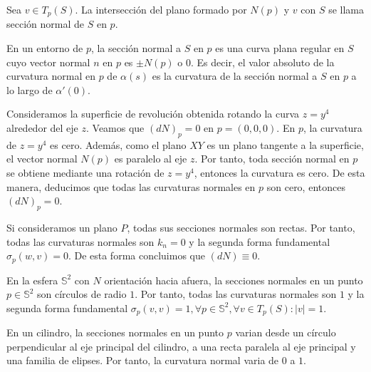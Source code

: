 \begin{defn}
  Sea $v \in T_{p}(S)$. La intersección del plano formado por $N(p)$ y $v$ con $S$ se llama sección normal de $S$ en $p$.
\end{defn}

\begin{obs}
  En un entorno de $p$, la sección normal a $S$ en $p$ es una curva plana regular en $S$ cuyo vector normal $n$ en $p$ es $\pm N(p)$ o $0$. Es decir, el valor absoluto de la curvatura normal en $p$ de $\alpha(s)$ es la curvatura de la sección normal a $S$ en $p$ a lo largo de $\alpha'(0)$.
\end{obs}

\begin{ejm}
  Consideramos la superficie de revolución obtenida rotando la curva $z = y^{4}$ alrededor del eje $z$. Veamos que $(d N)_{p} = 0$ en $p = (0, 0, 0)$. En $p$, la curvatura de $z = y^{4}$ es cero. Además, como el plano $XY$ es un plano tangente a la superficie, el vector normal $N(p)$ es paralelo al eje $z$. Por tanto, toda sección normal en $p$ se obtiene mediante una rotación de $z = y^{4}$, entonces la curvatura es cero. De esta manera, deducimos que todas las curvaturas normales en $p$ son cero, entonces $(d N)_{p} = 0$.
\end{ejm}

\begin{ejm}[Plano]
  Si consideramos un plano $P$, todas sus secciones normales son rectas. Por tanto, todas las curvaturas normales son $k_{n} = 0$ y la segunda forma fundamental $\sigma_{p}(w,v) = 0$. De esta forma concluimos que $(d N) \equiv 0$.
\end{ejm}

\begin{ejm}[Esfera]
  En la esfera $\mathbb{S}^{2}$ con $N$ orientación hacia afuera, la secciones normales en un punto $p \in \mathbb{S}^{2}$ son círculos de radio $1$. Por tanto, todas las curvaturas normales son $1$ y la segunda forma fundamental $\sigma_{p}(v,v) = 1, \forall p \in \mathbb{S}^{2}, \forall v \in T_{p}(S) : | v | = 1$.
\end{ejm}

\begin{ejm}[Cilindro]
  En un cilindro, la secciones normales en un punto $p$ varian desde un círculo perpendicular al eje principal del cilindro, a una recta paralela al eje principal y una familia de elipses. Por tanto, la curvatura normal varia de $0$ a $1$.
\end{ejm}


